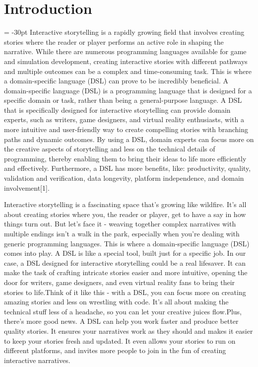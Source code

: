 \chapter*{Introduction}
\oddsidemargin = -30pt
    Interactive storytelling is a rapidly growing field that involves creating stories where the reader or player performs an active role in shaping the narrative. While there are numerous programming languages available for game and simulation development, creating interactive stories with different pathways and multiple outcomes can be a complex and time-consuming task. This is where a domain-specific language (DSL) can prove to be incredibly beneficial. A domain-specific language (DSL) is a programming language that is designed for a specific domain or task, rather than being a general-purpose language. A DSL that is specifically designed for interactive storytelling can provide domain experts, such as writers, game designers, and virtual reality enthusiasts, with a more intuitive and user-friendly way to create compelling stories with branching paths and dynamic outcomes. By using a DSL, domain experts can focus more on the creative aspects of storytelling and less on the technical details of programming, thereby enabling them to bring their ideas to life more efficiently and effectively. Furthermore, a DSL has more benefits, like: productivity, quality, validation and verification, data longevity, platform independence, and domain involvement[1].
    
    Interactive storytelling is a fascinating space that's growing like wildfire. It's all about creating stories where you, the reader or player, get to have a say in how things turn out. But let's face it - weaving together complex narratives with multiple endings isn't a walk in the park, especially when you're dealing with generic programming languages.
    This is where a domain-specific language (DSL) comes into play. A DSL is like a special tool, built just for a specific job. In our case, a DSL designed for interactive storytelling could be a real lifesaver. It can make the task of crafting intricate stories easier and more intuitive, opening the door for writers, game designers, and even virtual reality fans to bring their stories to life.Think of it like this - with a DSL, you can focus more on creating amazing stories and less on wrestling with code. It's all about making the technical stuff less of a headache, so you can let your creative juices flow.Plus, there's more good news. A DSL can help you work faster and produce better quality stories. It ensures your narratives work as they should and makes it easier to keep your stories fresh and updated. It even allows your stories to run on different platforms, and invites more people to join in the fun of creating interactive narratives.
    
